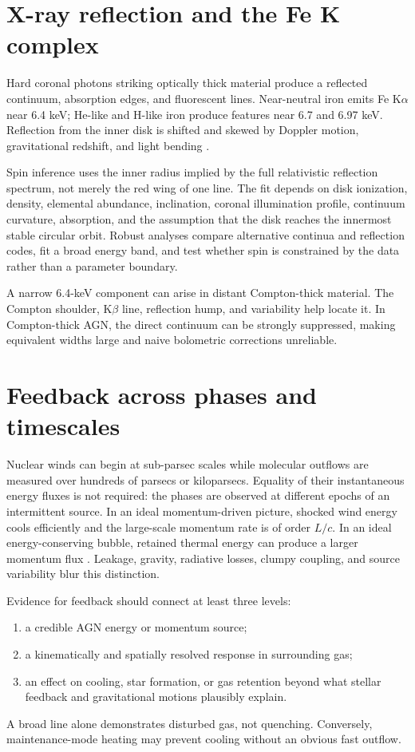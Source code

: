 \section{X-ray reflection and the Fe K complex}

Hard coronal photons striking optically thick material produce a reflected
continuum, absorption edges, and fluorescent lines. Near-neutral iron emits
Fe K$\alpha$ near 6.4 keV; He-like and H-like iron produce features near
6.7 and 6.97 keV. Reflection from the inner disk is shifted and skewed by
Doppler motion, gravitational redshift, and light bending
\citep{GeorgeFabian1991,Reynolds2014}.

Spin inference uses the inner radius implied by the full relativistic
reflection spectrum, not merely the red wing of one line. The fit depends on
disk ionization, density, elemental abundance, inclination, coronal
illumination profile, continuum curvature, absorption, and the assumption
that the disk reaches the innermost stable circular orbit. Robust analyses
compare alternative continua and reflection codes, fit a broad energy band,
and test whether spin is constrained by the data rather than a parameter
boundary.

A narrow 6.4-keV component can arise in distant Compton-thick material.
The Compton shoulder, K$\beta$ line, reflection hump, and variability help
locate it. In Compton-thick AGN, the direct continuum can be strongly
suppressed, making equivalent widths large and naive bolometric corrections
unreliable.

\section{Feedback across phases and timescales}

Nuclear winds can begin at sub-parsec scales while molecular outflows are
measured over hundreds of parsecs or kiloparsecs. Equality of their
instantaneous energy fluxes is not required: the phases are observed at
different epochs of an intermittent source. In an ideal momentum-driven
picture, shocked wind energy cools efficiently and the large-scale momentum
rate is of order $L/c$. In an ideal energy-conserving bubble, retained thermal
energy can produce a larger momentum flux \citep{KingPounds2015}. Leakage,
gravity, radiative losses, clumpy coupling, and source variability blur this
distinction.

Evidence for feedback should connect at least three levels:
\begin{enumerate}
  \item a credible AGN energy or momentum source;
  \item a kinematically and spatially resolved response in surrounding gas;
  \item an effect on cooling, star formation, or gas retention beyond what
  stellar feedback and gravitational motions plausibly explain.
\end{enumerate}
A broad line alone demonstrates disturbed gas, not quenching. Conversely,
maintenance-mode heating may prevent cooling without an obvious fast outflow.

